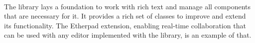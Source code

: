 




\

The library lays a foundation to work with rich text and manage all components that are necessary for it. It provides a rich set of classes to improve and extend its functionality. The Etherpad extension, enabling real-time collaboration that can be used with any editor implemented with the library, is an example of that.

